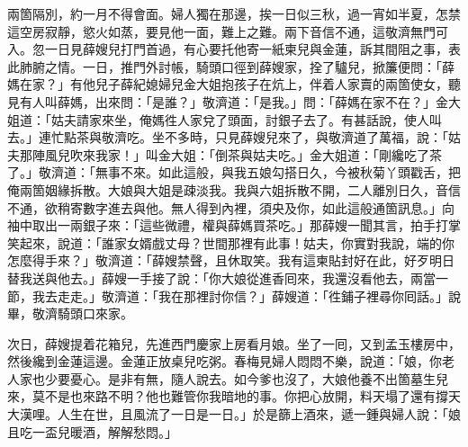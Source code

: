 兩箇隔別，約一月不得會面。婦人獨在那邊，挨一日似三秋，過一宵如半夏，怎禁這空房寂靜，慾火如蒸，要見他一面，難上之難。兩下音信不通，這敬濟無門可入。忽一日見薛嫂兒打門首過，有心要托他寄一紙柬兒與金蓮，訴其間阻之事，表此肺腑之情。一日，推門外討帳，騎頭口徑到薛嫂家，拴了驢兒，掀簾便問：「薛媽在家？」有他兒子薛紀媳婦兒金大姐抱孩子在炕上，伴着人家賣的兩箇使女，聽見有人叫薛媽，出來問：「是誰？」敬濟道：「是我。」問：「薛媽在家不在？」金大姐道：「姑夫請家來坐，俺媽徃人家兌了頭面，討銀子去了。有甚話說，使人叫去。」連忙點茶與敬濟吃。坐不多時，只見薛嫂兒來了，與敬濟道了萬福，說：「姑夫那陣風兒吹來我家！」叫金大姐：「倒茶與姑夫吃。」金大姐道：「剛纔吃了茶了。」敬濟道：「無事不來。如此這般，與我五娘勾搭日久，今被秋菊丫頭戳舌，把俺兩箇姻緣拆散。大娘與大姐是疎淡我。我與六姐拆散不開，二人離別日久，音信不通，欲稍寄數字進去與他。無人得到內裡，須央及你，如此這般通箇訊息。」向袖中取出一兩銀子來：「這些微禮，權與薛媽買茶吃。」那薛嫂一聞其言，拍手打掌笑起來，說道：「誰家女婿戲丈母？世間那裡有此事！姑夫，你實對我說，端的你怎麼得手來？」敬濟道：「薛嫂禁聲，且休取笑。我有這柬貼封好在此，好歹明日替我送與他去。」薛嫂一手接了說：「你大娘從進香囘來，我還沒看他去，兩當一節，我去走走。」敬濟道：「我在那裡討你信？」薛嫂道：「徃鋪子裡尋你囘話。」說畢，敬濟騎頭口來家。

次日，薛嫂提着花箱兒，先進西門慶家上房看月娘。坐了一囘，又到孟玉樓房中，然後纔到金蓮這邊。金蓮正放桌兒吃粥。春梅見婦人悶悶不樂，說道：「娘，你老人家也少要憂心。是非有無，隨人說去。如今爹也沒了，大娘他養不出箇墓生兒來，莫不是也來路不明？他也難管你我暗地的事。你把心放開，料天塌了還有撐天大漢哩。人生在世，且風流了一日是一日。」{}於是篩上酒來，遞一鍾與婦人說：「娘且吃一盃兒暖酒，解解愁悶。」

